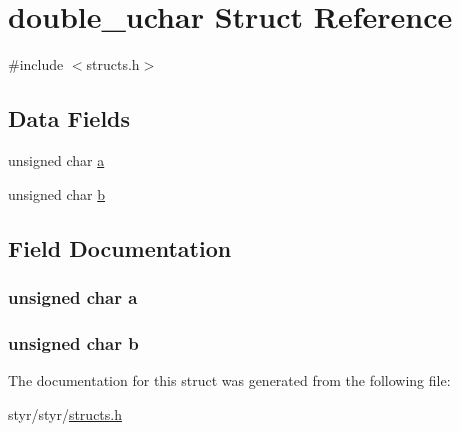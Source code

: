 \hypertarget{structdouble__uchar}{}\section{double\+\_\+uchar Struct Reference}
\label{structdouble__uchar}


{\ttfamily \#include $<$structs.\+h$>$}

\subsection*{Data Fields}
\begin{DoxyCompactItemize}
\item 
unsigned char \hyperlink{structdouble__uchar_a24420a9beaac7cee08b5e255a4c29db1}{a}
\item 
unsigned char \hyperlink{structdouble__uchar_a41cede1b4c0d05cff170ad5761f70964}{b}
\end{DoxyCompactItemize}


\subsection{Field Documentation}
\subsubsection[{\texorpdfstring{a}{a}}]{\setlength{\rightskip}{0pt plus 5cm}unsigned char a}\hypertarget{structdouble__uchar_a24420a9beaac7cee08b5e255a4c29db1}{}\label{structdouble__uchar_a24420a9beaac7cee08b5e255a4c29db1}
\subsubsection[{\texorpdfstring{b}{b}}]{\setlength{\rightskip}{0pt plus 5cm}unsigned char b}\hypertarget{structdouble__uchar_a41cede1b4c0d05cff170ad5761f70964}{}\label{structdouble__uchar_a41cede1b4c0d05cff170ad5761f70964}


The documentation for this struct was generated from the following file\+:\begin{DoxyCompactItemize}
\item 
styr/styr/\hyperlink{structs_8h}{structs.\+h}\end{DoxyCompactItemize}
